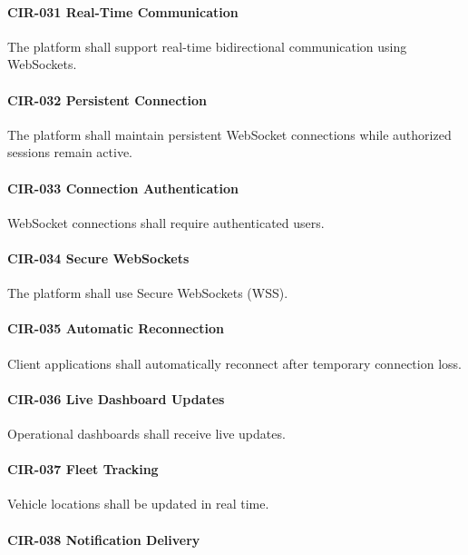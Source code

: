 \paragraph{CIR-031 Real-Time Communication}

The platform shall support real-time bidirectional communication using
WebSockets.

\paragraph{CIR-032 Persistent Connection}

The platform shall maintain persistent WebSocket connections while
authorized sessions remain active.

\paragraph{CIR-033 Connection Authentication}

WebSocket connections shall require authenticated users.

\paragraph{CIR-034 Secure WebSockets}

The platform shall use Secure WebSockets (WSS).

\paragraph{CIR-035 Automatic Reconnection}

Client applications shall automatically reconnect after temporary
connection loss.

\paragraph{CIR-036 Live Dashboard Updates}

Operational dashboards shall receive live updates.

\paragraph{CIR-037 Fleet Tracking}

Vehicle locations shall be updated in real time.

\paragraph{CIR-038 Notification Delivery}

